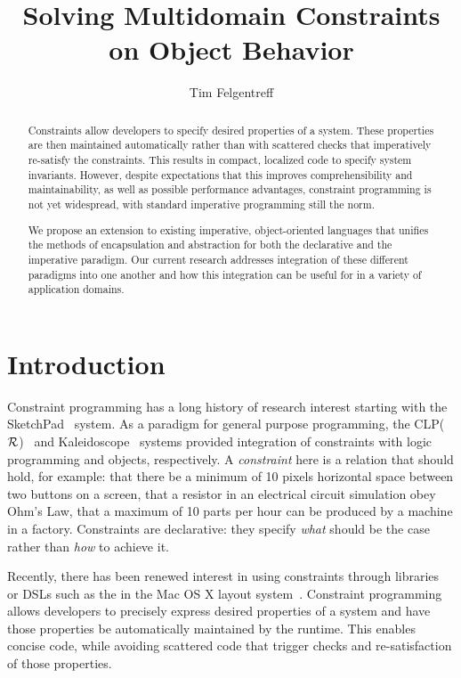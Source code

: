 \documentclass[english, inproceedings]{polze}
\begin{document}
\author{Tim Felgentreff}

\title{Solving Multidomain Constraints on Object Behavior}
\maketitle
\begin{abstract}
  Constraints allow developers to specify desired properties of a
  system. These properties are then maintained automatically rather
  than with scattered checks that imperatively re-satisfy the
  constraints. This results in compact, localized code to specify
  system invariants. However, despite expectations that this improves
  comprehensibility and maintainability, as well as possible
  performance advantages, constraint programming is not yet
  widespread, with standard imperative programming still the norm.

  We propose an extension to existing imperative, object-oriented
  languages that unifies the methods of encapsulation and abstraction
  for both the declarative and the imperative paradigm. Our current
  research addresses integration of these different paradigms into one
  another and how this integration can be useful for in a variety of
  application domains.
\end{abstract}

\section{Introduction}
\label{sec:introduction}
Constraint programming has a long history of research interest
starting with the SketchPad~\cite{sutherland-ifips-1963} system. As a
paradigm for general purpose programming, the CLP($\cal
R$)~\cite{jaffar-toplas-1992} and Kaleidoscope~\cite{lopez-phd}
systems provided integration of constraints with logic programming and
objects, respectively. A \emph{constraint} here is a relation that
should hold, for example: that there be a minimum of 10 pixels
horizontal space between two buttons on a screen, that a resistor in
an electrical circuit simulation obey Ohm's Law, that a maximum of 10
parts per hour can be produced by a machine in a factory. Constraints
are declarative: they specify \emph{what} should be the case rather
than \emph{how} to achieve it.

Recently, there has been renewed interest in using constraints through
libraries~\cite{milicevic2011unifying} or DSLs such as the in the Mac
OS X layout system~\cite{AppleCocoaAutoLayout}.  Constraint
programming allows developers to precisely express desired properties
of a system and have those properties be automatically maintained by
the runtime. This enables concise code, while avoiding scattered code
that trigger checks and re-satisfaction of those properties.
\end{document}
